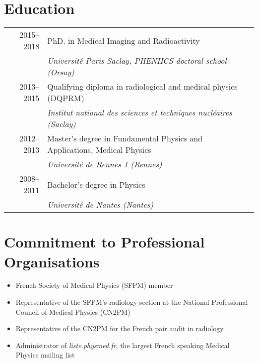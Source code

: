 \documentclass[a4paper, 10pt]{article}
\begin{document}
    \section{Education}
    
        \begin{tabularx}{\textwidth}{r|X}
            2015--2018 & PhD. in Medical Imaging and Radioactivity\\
            & \emph{Université Paris-Saclay, PHENIICS doctoral school (Orsay)}\\
    
            \rule{0pt}{18pt}
            
            2013--2015 & Qualifying diploma in radiological and medical physics (DQPRM)\\
            & \emph{Institut national des sciences et techniques nucléaires (Saclay)}\\
    
            \rule{0pt}{18pt}
      
            2012--2013 & Master's degree in Fundamental Physics and Applications, Medical Physics\\
            & \emph{Université de Rennes 1 (Rennes)}\\
    
            \rule{0pt}{18pt}
          
            2008--2011 & Bachelor's degree in Physics\\
            & \emph{Université de Nantes (Nantes)}\\
          
        \end{tabularx}
    
    \section{Commitment to Professional Organisations}
      
        \begin{itemize}
            \setlength\itemsep{-.4em}
            \item French Society of Medical Physics (SFPM) member
            \item Representative of the SFPM's radiology section at the National Professional Council of Medical Physics (CN2PM)
            \item Representative of the CN2PM for the French pair audit in radiology
            \item Administrator of \emph{liste.physmed.fr}, the largest French speaking Medical Physics mailing list
        \end{itemize}
     
\end{document}
